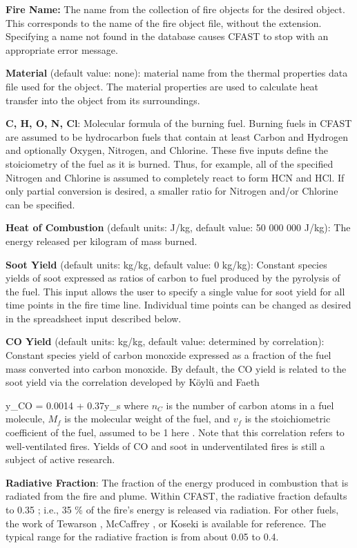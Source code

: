 \textbf{Fire Name:} The name from the collection of fire objects for the desired object.  This corresponds to the name of the fire object file, without the extension. Specifying a name not found in the database causes CFAST to stop with an appropriate error message.

\textbf{Material} (default value: none): material name from the thermal properties data file used for the object. The material properties are used to calculate heat transfer into the object from its surroundings.

\textbf{C, H, O, N, Cl}: Molecular formula of the burning fuel. Burning fuels in CFAST are assumed to be hydrocarbon fuels that contain at least Carbon and Hydrogen and optionally Oxygen, Nitrogen, and Chlorine. These five inputs define the stoiciometry of the fuel as it is burned.  Thus, for example, all of the specified Nitrogen and Chlorine is assumed to completely react to form HCN and HCl.  If only partial conversion is desired, a smaller ratio for Nitrogen and/or Chlorine can be specified.

\textbf{Heat of Combustion} (default units: J/kg, default value: 50 000 000 J/kg): The energy released per kilogram of mass burned.

\textbf{Soot Yield} (default units: kg/kg, default value: 0 kg/kg): Constant species yields of soot expressed as ratios of carbon to fuel produced by the pyrolysis of the fuel. This input allows the user to specify a single value for soot yield for all time points in the fire time line. Individual time points can be changed as desired in the spreadsheet input described below.

\textbf{CO Yield} (default units: kg/kg, default value: determined by correlation): Constant species yield of carbon monoxide expressed as a fraction of the fuel mass converted into carbon monoxide.  By default, the CO yield is related to the soot yield via the correlation developed by K\"oyl\"u and Faeth

\be
y_{CO} = 0.0014 + 0.37y_s \label{eq:Koylu} \ee
where $n_C$ is the number of carbon atoms in a fuel molecule, $M_f$ is the molecular weight of the fuel, and $v_f$ is the stoichiometric coefficient of the fuel, assumed to be 1 here \cite{Koylu:1991}. Note that this correlation refers to well-ventilated fires. Yields of CO and soot in underventilated fires is still a subject of active research.

\textbf{Radiative Fraction}: The fraction of the energy produced in combustion that is radiated from the fire and plume. Within CFAST, the radiative fraction defaults to 0.35 ; i.e., 35 \% of the fire’s energy is released via radiation.  For other fuels, the work of Tewarson \cite{Tewarson:2003}, McCaffrey \cite{McCaffrey:1982}, or Koseki \cite{Koseki:1989} is available for reference.  The typical range for the radiative fraction is from about 0.05 to 0.4.

